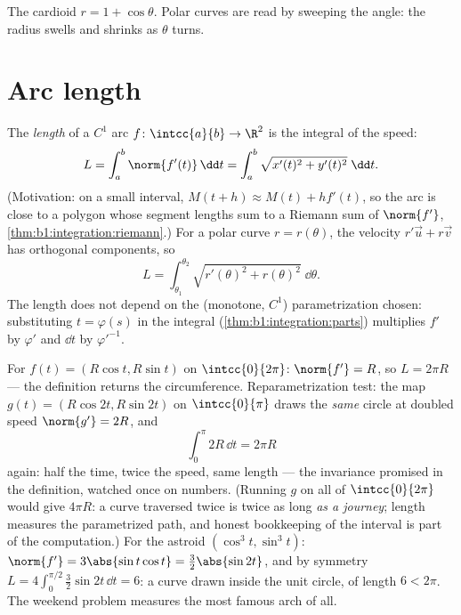 \begin{omfigure}

{\small The cardioid $r = 1 + \cos\theta$. Polar curves are read by
sweeping the angle: the radius swells and shrinks as $\theta$
turns.}
\end{omfigure}

\section{Arc length}

\begin{definition}\label{def:b1:curves:arclength}
The \emph{length} of a $C^1$ arc $f \colon
\intcc{a}{b} \to \R^2$ is the integral of the speed:
\[
L = \int_a^b \norm{f'(t)}\,\dd t
= \int_a^b \sqrt{x'(t)^2 + y'(t)^2}\;\dd t .
\]
(Motivation: on a small interval, $M(t + h) \approx M(t) + h
f'(t)$, so the arc is close to a polygon whose segment lengths sum
to a Riemann sum of $\norm{f'}$,
\cref{thm:b1:integration:riemann}.) For a polar curve $r =
r(\theta)$, the velocity $r'\vec u + r\vec v$ has orthogonal
components, so
\[
L = \int_{\theta_1}^{\theta_2}
\sqrt{r'(\theta)^2 + r(\theta)^2}\;\dd\theta .
\]
The length does not depend on the (monotone, $C^1$)
parametrization chosen: substituting $t = \varphi(s)$ in the
integral (\cref{thm:b1:integration:parts}) multiplies $f'$ by
$\varphi'$ and $\dd t$ by $\varphi'^{-1}$.
\end{definition}

\begin{example}\label{ex:b1:curves:circlelength}
For $f(t) = (R\cos t, R\sin t)$ on $\intcc{0}{2\pi}$: $\norm{f'} =
R$, so $L = 2\pi R$ --- the definition returns the circumference.
Reparametrization test: the map $g(t) = (R\cos 2t, R\sin 2t)$ on
$\intcc{0}{\pi}$ draws the \emph{same} circle at doubled speed
$\norm{g'} = 2R$, and
\[
\int_0^{\pi} 2R\,\dd t = 2\pi R
\]
again: half the time, twice the speed, same length --- the
invariance promised in the definition, watched once on numbers.
(Running $g$ on all of $\intcc{0}{2\pi}$ would give $4\pi R$: a
curve traversed twice is twice as long \emph{as a journey};
length measures the parametrized path, and honest bookkeeping of
the interval is part of the computation.)
For the astroid $(\cos^3t, \sin^3t)$: $\norm{f'} = 3\abs{\sin
t\cos t} = \tfrac32\abs{\sin 2t}$, and by symmetry $L = 4\int_0^{\pi/2}
\tfrac32\sin 2t\,\dd t = 6$: a curve drawn inside the unit circle,
of length $6 < 2\pi$. The weekend problem measures the most famous
arch of all.
\end{example}


